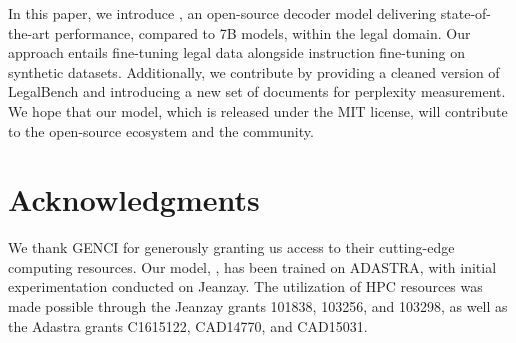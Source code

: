 In this paper, we introduce \ourmodel{}, an open-source decoder model delivering state-of-the-art performance, compared to 7B models, within the legal domain. Our approach entails fine-tuning legal data alongside instruction fine-tuning on synthetic datasets. Additionally, we contribute by providing a cleaned version of LegalBench and introducing a new set of documents for perplexity measurement. We hope that our model, which is released under the MIT license, will contribute to the open-source ecosystem and the community.

\section*{Acknowledgments}
We thank GENCI for generously granting us access to their cutting-edge computing resources. Our model, \ourmodel{}, has been trained on ADASTRA, with initial experimentation conducted on Jeanzay. The utilization of HPC resources was made possible through the Jeanzay grants 101838, 103256, and 103298, as well as the Adastra grants C1615122, CAD14770, and CAD15031.

